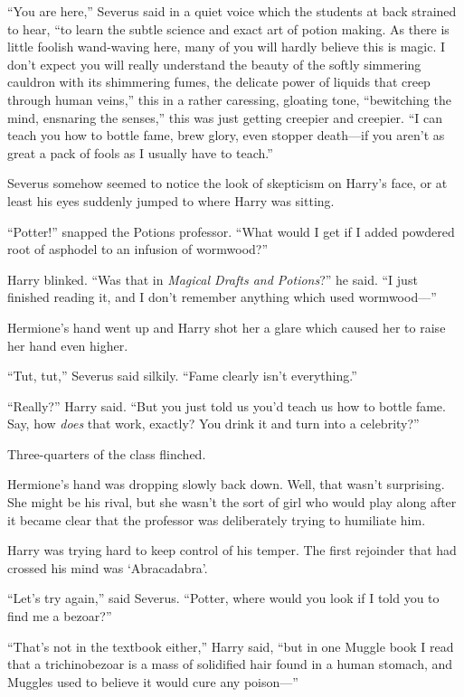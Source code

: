 “You are here,” Severus said in a quiet voice which the students at back strained to hear, “to learn the subtle science and exact art of potion making. As there is little foolish wand-waving here, many of you will hardly believe this is magic. I don’t expect you will really understand the beauty of the softly simmering cauldron with its shimmering fumes, the delicate power of liquids that creep through human veins,” this in a rather caressing, gloating tone, “bewitching the mind, ensnaring the senses,” this was just getting creepier and creepier. “I can teach you how to bottle fame, brew glory, even stopper death—if you aren’t as great a pack of fools as I usually have to teach.”

Severus somehow seemed to notice the look of skepticism on Harry’s face, or at least his eyes suddenly jumped to where Harry was sitting.

“Potter!” snapped the Potions professor. “What would I get if I added powdered root of asphodel to an infusion of wormwood?”

Harry blinked. “Was that in \emph{Magical Drafts and Potions}?” he said. “I just finished reading it, and I don’t remember anything which used wormwood—”

Hermione’s hand went up and Harry shot her a glare which caused her to raise her hand even higher.

“Tut, tut,” Severus said silkily. “Fame clearly isn’t everything.”

“Really?” Harry said. “But you just told us you’d teach us how to bottle fame. Say, how \emph{does} that work, exactly? You drink it and turn into a celebrity?”

Three-quarters of the class flinched.

Hermione’s hand was dropping slowly back down. Well, that wasn’t surprising. She might be his rival, but she wasn’t the sort of girl who would play along after it became clear that the professor was deliberately trying to humiliate him.

Harry was trying hard to keep control of his temper. The first rejoinder that had crossed his mind was ‘Abracadabra’.

“Let’s try again,” said Severus. “Potter, where would you look if I told you to find me a bezoar?”

“That’s not in the textbook either,” Harry said, “but in one Muggle book I read that a trichinobezoar is a mass of solidified hair found in a human stomach, and Muggles used to believe it would cure any poison—”

